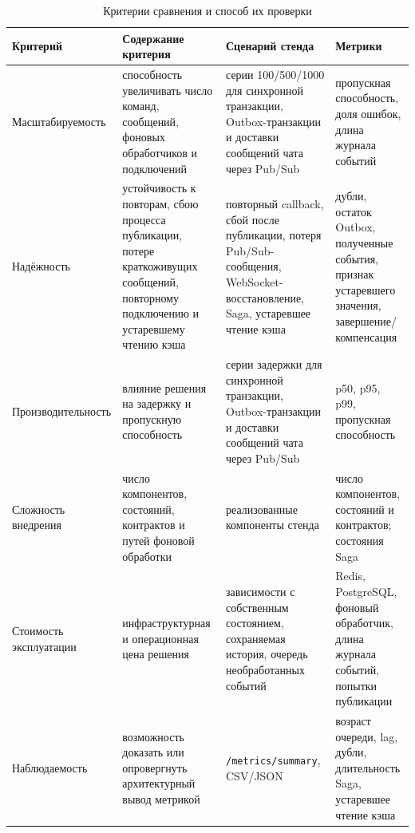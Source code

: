 \documentclass[a4paper,14pt]{extarticle}
\newcommand{\tablefont}{\scriptsize}
\renewcommand{\toprule}{\hline}
\renewcommand{\midrule}{\hline}
\renewcommand{\bottomrule}{\hline}
\numberwithin{figure}{section}
\numberwithin{table}{section}
\begin{document}
\begin{table}[H]
\centering
\caption{Критерии сравнения и способ их проверки}
\label{tab:criteria-main}
\tablefont
\setlength{\tabcolsep}{1.5pt}
\renewcommand{\arraystretch}{1.15}
\begin{tabular}{|L{2.9cm}|L{4.5cm}|L{4.2cm}|L{3.6cm}|}
\toprule
Критерий & Содержание критерия & Сценарий стенда & Метрики \\
\midrule
Масштабируемость & способность увеличивать число команд, сообщений, фоновых обработчиков и подключений & серии 100/500/1000 для синхронной транзакции, Outbox-транзакции и доставки сообщений чата через Pub/Sub & пропускная способность, доля ошибок, длина журнала событий \\
\hline
Надёжность & устойчивость к повторам, сбою процесса публикации, потере краткоживущих сообщений, повторному подключению и устаревшему чтению кэша & повторный callback, сбой после публикации, потеря Pub/Sub-сообщения, WebSocket-восстановление, Saga, устаревшее чтение кэша & дубли, остаток Outbox, полученные события, признак устаревшего значения, завершение/компенсация \\
\hline
Производительность & влияние решения на задержку и пропускную способность & серии задержки для синхронной транзакции, Outbox-транзакции и доставки сообщений чата через Pub/Sub & p50, p95, p99, пропускная способность \\
\hline
Сложность внедрения & число компонентов, состояний, контрактов и путей фоновой обработки & реализованные компоненты стенда & число компонентов, состояний и контрактов; состояния Saga \\
\hline
Стоимость эксплуатации & инфраструктурная и операционная цена решения & зависимости с собственным состоянием, сохраняемая история, очередь необработанных событий & Redis, PostgreSQL, фоновый обработчик, длина журнала событий, попытки публикации \\
\hline
Наблюдаемость & возможность доказать или опровергнуть архитектурный вывод метрикой & \texttt{/metrics/summary}, CSV/JSON & возраст очереди, lag, дубли, длительность Saga, устаревшее чтение кэша \\
\bottomrule
\end{tabular}
\end{table}
\end{document}
